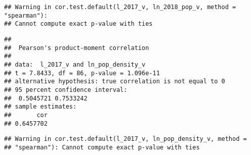 \documentclass[]{article}
\newenvironment{Shaded}{\begin{snugshade}}{\end{snugshade}}
\newcommand{\DataTypeTok}[1]{\textcolor[rgb]{0.13,0.29,0.53}{#1}}
\newcommand{\DecValTok}[1]{\textcolor[rgb]{0.00,0.00,0.81}{#1}}
\newcommand{\KeywordTok}[1]{\textcolor[rgb]{0.13,0.29,0.53}{\textbf{#1}}}
\newcommand{\NormalTok}[1]{#1}
\newcommand{\OperatorTok}[1]{\textcolor[rgb]{0.81,0.36,0.00}{\textbf{#1}}}
\newcommand{\StringTok}[1]{\textcolor[rgb]{0.31,0.60,0.02}{#1}}
\begin{document}
\begin{verbatim}
## Warning in cor.test.default(l_2017_v, ln_2018_pop_v, method = "spearman"):
## Cannot compute exact p-value with ties
\end{verbatim}

\begin{Shaded}
\end{Shaded}

\begin{verbatim}
## 
##  Pearson's product-moment correlation
## 
## data:  l_2017_v and ln_pop_density_v
## t = 7.8433, df = 86, p-value = 1.096e-11
## alternative hypothesis: true correlation is not equal to 0
## 95 percent confidence interval:
##  0.5045721 0.7533242
## sample estimates:
##       cor 
## 0.6457702
\end{verbatim}

\begin{Shaded}
\end{Shaded}

\begin{verbatim}
## Warning in cor.test.default(l_2017_v, ln_pop_density_v, method =
## "spearman"): Cannot compute exact p-value with ties
\end{verbatim}
\end{document}
